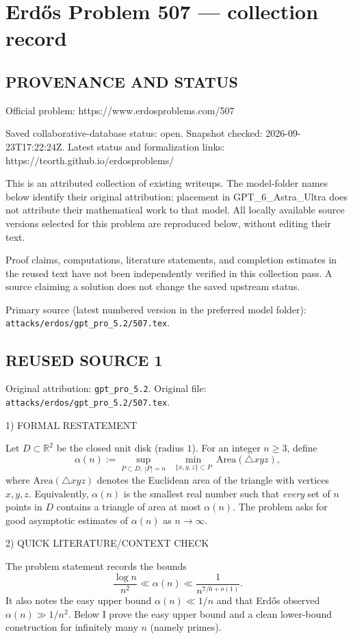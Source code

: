 \section*{Erd\H{o}s Problem 507 --- collection record}

\subsection*{PROVENANCE AND STATUS}
Official problem: https://www.erdosproblems.com/507

Saved collaborative-database status: open.
Snapshot checked: 2026-09-23T17:22:24Z.
Latest status and formalization links: https://teorth.github.io/erdosproblems/

This is an attributed collection of existing writeups. The model-folder names below identify their original attribution; placement in GPT\_6\_Astra\_Ultra does not attribute their mathematical work to that model. All locally available source versions selected for this problem are reproduced below, without editing their text.

Proof claims, computations, literature statements, and completion estimates in the reused text have not been independently verified in this collection pass. A source claiming a solution does not change the saved upstream status.

Primary source (latest numbered version in the preferred model folder): \texttt{attacks/erdos/gpt\_pro\_5.2/507.tex}.

\subsection*{REUSED SOURCE 1}
Original attribution: \texttt{gpt\_pro\_5.2}.
Original file: \texttt{attacks/erdos/gpt\_pro\_5.2/507.tex}.


1) FORMAL RESTATEMENT

Let $D\subset\mathbb R^2$ be the closed unit disk (radius $1$).
For an integer $n\ge 3$, define
\[
\alpha(n):=\sup_{P\subset D,\ |P|=n}\ \ \min_{\{x,y,z\}\subset P}\ \mathrm{Area}(\triangle xyz),
\]
where $\mathrm{Area}(\triangle xyz)$ denotes the Euclidean area of the triangle with vertices $x,y,z$.
Equivalently, $\alpha(n)$ is the smallest real number such that \emph{every} set of $n$ points in $D$ contains a triangle of area at most $\alpha(n)$.
The problem asks for good asymptotic estimates of $\alpha(n)$ as $n\to\infty$.

2) QUICK LITERATURE/CONTEXT CHECK

The problem statement records the bounds
\[\frac{\log n}{n^2}\ll \alpha(n) \ll \frac{1}{n^{7/6+o(1)}}.
\]
It also notes the easy upper bound $\alpha(n)\ll 1/n$ and that Erd\H{o}s observed $\alpha(n)\gg 1/n^2$.
Below I prove the easy upper bound and a clean lower-bound construction for infinitely many $n$ (namely primes).

